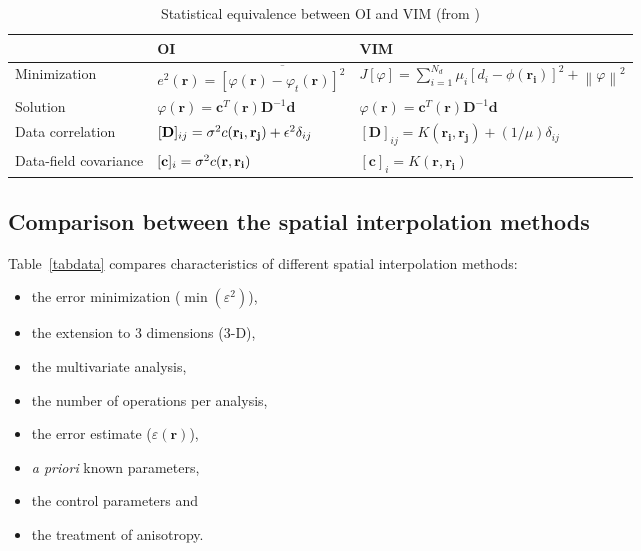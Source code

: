 \begin{table}[htpb]
\caption{Statistical equivalence between OI and VIM (from \cite{RIXEN00})\label{tabOAVIM}}
\begin{tabular*}{0.99\textwidth}{@{\extracolsep{\fill}}lll}
\toprule
											&		OI	& VIM \\
\midrule
Minimization \rule{0pt}{3ex}	& $e^{2}(\mathbf{r})= \overline{ [\varphi(\mathbf{r})-\varphi_{t}(\mathbf{r})]^{2}}$ 	& $J[\varphi]=\sum_{i=1}^{N_d}\mu_{i}[d_{i}-\phi(\mathbf{r_{i}})]^{2}+\left\|\varphi\right\|^{2}$							\\
Solution						& $\varphi(\mathbf{r})= \mathbf{c}^{T}(\mathbf{r})\mathbf{D}^{-1}\mathbf{d}$			& 
$\varphi(\mathbf{r})= \mathbf{c}^{T}(\mathbf{r})\mathbf{D}^{-1}\mathbf{d}$												\\
Data correlation				& $[\mathbf{D}]_{ij}=\sigma^{2} c(\mathbf{r_{i}},\mathbf{r_{j}})+\epsilon^{2}\delta_{ij}$& $[\mathbf{D}]_{ij}=K(\mathbf{r_i},\mathbf{r_j})+(1/\mu)\delta_{ij}$														\\
Data-field covariance 			& $[\mathbf{c}]_{i}=\sigma^{2} c(\mathbf{r},\mathbf{r_{i}})$							& $[\mathbf{c}]_{i}=K(\mathbf{r},\mathbf{r_{i}})$																			\\
\bottomrule
\end{tabular*}
\end{table}

\subsection{Comparison between the spatial interpolation methods}

Table~\ref{tabdata} compares characteristics of different spatial interpolation methods: 
\begin{itemize}
\item the error minimization ($\min( \varepsilon^2)$),
\item the extension to 3 dimensions (3-D), 
\item the multivariate analysis, 
\item the number of operations per analysis, 
\item the error estimate ($\varepsilon(\mathbf{r})$),
\item \textit{a priori} known parameters, 
\item the control parameters and 
\item the treatment of anisotropy. 
\end{itemize} 

